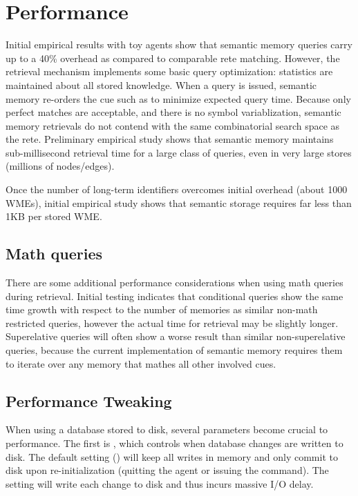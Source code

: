 \section{Performance}
\label{SMEM-perf}

Initial empirical results with toy agents show that semantic memory queries carry up to a 40\% overhead as compared to comparable rete matching.  
However, the retrieval mechanism implements some basic query optimization: statistics are maintained about all stored knowledge.  
When a query is issued, semantic memory re-orders the cue such as to minimize expected query time.  
Because only perfect matches are acceptable, and there is no symbol variablization, semantic memory retrievals do not contend with the same combinatorial search space as the rete.  
Preliminary empirical study shows that semantic memory maintains sub-millisecond retrieval time for a large class of queries, even in very large stores (millions of nodes/edges).

Once the number of long-term identifiers overcomes initial overhead (about 1000 WMEs), initial empirical study shows that semantic storage requires far less than 1KB per stored WME.

\subsection{Math queries}
There are some additional performance considerations when using math queries during retrieval.
Initial testing indicates that conditional queries show the same time growth with respect to the number of memories as similar non-math restricted queries, however the actual time for retrieval may be slightly longer.
Superelative queries will often show a worse result than similar non-superelative queries, because the current implementation of semantic memory requires them to iterate over any memory that mathes all other involved cues.

\subsection{Performance Tweaking}

When using a database stored to disk, several parameters become crucial to performance.  
The first is , which controls when database changes are written to disk.   
The default setting () will keep all writes in memory and only commit to disk upon re-initialization (quitting the agent or issuing the  command).  
The  setting will write each change to disk and thus incurs massive I/O delay.

